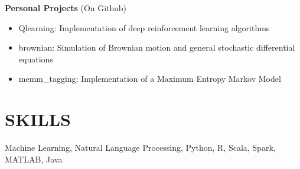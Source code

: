\documentclass{res}
\begin{document}
\begin{resume}
	\textbf{Personal Projects} (On Github)
	\begin{itemize}
	\item Qlearning: Implementation of deep reinforcement learning algorithms
	\item brownian: Simulation of Brownian motion and general stochastic differential equations
	\item memm\_tagging: Implementation of a Maximum Entropy Markov Model 
	\end{itemize}

\section{SKILLS}
	Machine Learning, Natural Language Processing, Python, R, Scala, Spark, MATLAB, Java


\end{resume}
\end{document}
